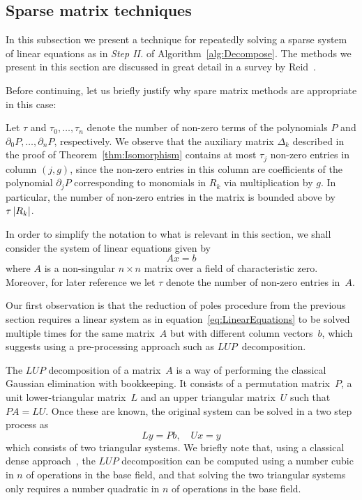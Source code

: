 
\subsection{Sparse matrix techniques}
\label{sec:01-04-sparse}

In this subsection we present a technique for repeatedly solving a sparse 
system of linear equations as in {\it Step II.} of 
Algorithm~\ref{alg:Decompose}.  The methods we present in this section are 
discussed in great detail in a survey by Reid~\citep{Rei76}.

Before continuing, let us briefly justify why spare matrix methods are 
appropriate in this case:

\begin{rem}
Let $\tau$ and $\tau_0, \dotsc, \tau_n$ denote the number of non-zero 
terms of the polynomials $P$ and $\partial_0 P, \dotsc, \partial_n P$, 
respectively.  We observe that the auxiliary matrix $\Delta_k$ described in 
the proof of Theorem~\ref{thm:Isomorphism} contains at most $\tau_j$ 
non-zero entries in column $(j, g)$, since the non-zero entries in this column 
are coefficients of the polynomial $\partial_j P$ corresponding to monomials 
in $R_k$ via multiplication by $g$.  In particular, the number of non-zero 
entries in the matrix is bounded above by $\tau \left\lvert R_k\right\rvert$.
\end{rem}

\begin{notation}
In order to simplify the notation to what is relevant in this section, we 
shall consider the system of linear equations given by 
\begin{equation} \label{eq:LinearEquations}
A x = b
\end{equation}
where $A$ is a non-singular $n \times n$ matrix over a field of characteristic 
zero.  Moreover, for later reference we let $\tau$ denote the number of 
non-zero entries in~$A$.
\end{notation}

Our first observation is that the reduction of poles procedure from the 
previous section requires a linear system as in 
equation~\eqref{eq:LinearEquations} to be solved multiple times for the same 
matrix~$A$ but with different column vectors~$b$, which suggests using a 
pre-processing approach such as $LUP$~decomposition.

The $LUP$ decomposition of a matrix~$A$ is a way of performing the 
classical Gaussian elimination with bookkeeping.  It consists of a 
permutation matrix~$P$, a unit lower-triangular matrix~$L$ and an upper 
triangular matrix~$U$ such that $PA = LU$.  Once these are known, the 
original system can be solved in a two step process as
\begin{equation}
L y = P b, \quad U x = y
\end{equation}
which consists of two triangular systems.  We briefly note that, using a 
classical dense approach~\citep{Cor90}, the $LUP$ decomposition can be 
computed using a number cubic in $n$ of operations in the base field, and 
that solving the two triangular systems only requires a number quadratic in 
$n$ of operations in the base field.

